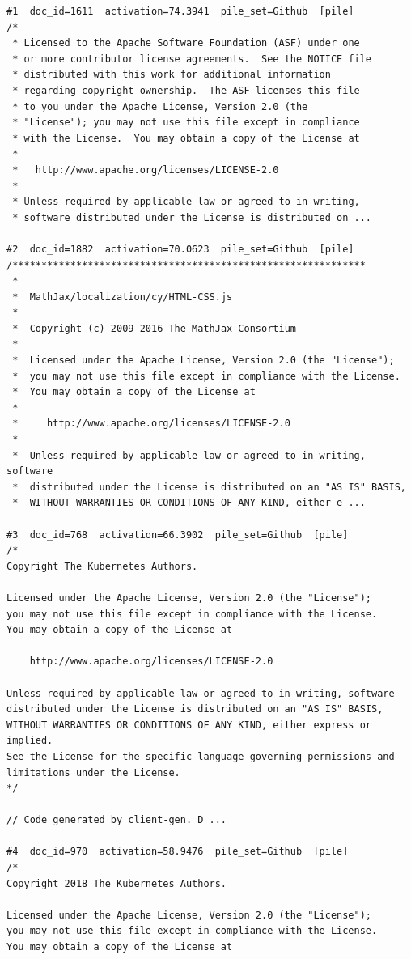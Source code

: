 \begin{verbatim}
#1  doc_id=1611  activation=74.3941  pile_set=Github  [pile]
/*
 * Licensed to the Apache Software Foundation (ASF) under one
 * or more contributor license agreements.  See the NOTICE file
 * distributed with this work for additional information
 * regarding copyright ownership.  The ASF licenses this file
 * to you under the Apache License, Version 2.0 (the
 * "License"); you may not use this file except in compliance
 * with the License.  You may obtain a copy of the License at
 *
 *   http://www.apache.org/licenses/LICENSE-2.0
 *
 * Unless required by applicable law or agreed to in writing,
 * software distributed under the License is distributed on ...

#2  doc_id=1882  activation=70.0623  pile_set=Github  [pile]
/*************************************************************
 *
 *  MathJax/localization/cy/HTML-CSS.js
 *
 *  Copyright (c) 2009-2016 The MathJax Consortium
 *
 *  Licensed under the Apache License, Version 2.0 (the "License");
 *  you may not use this file except in compliance with the License.
 *  You may obtain a copy of the License at
 *
 *     http://www.apache.org/licenses/LICENSE-2.0
 *
 *  Unless required by applicable law or agreed to in writing, software
 *  distributed under the License is distributed on an "AS IS" BASIS,
 *  WITHOUT WARRANTIES OR CONDITIONS OF ANY KIND, either e ...

#3  doc_id=768  activation=66.3902  pile_set=Github  [pile]
/*
Copyright The Kubernetes Authors.

Licensed under the Apache License, Version 2.0 (the "License");
you may not use this file except in compliance with the License.
You may obtain a copy of the License at

    http://www.apache.org/licenses/LICENSE-2.0

Unless required by applicable law or agreed to in writing, software
distributed under the License is distributed on an "AS IS" BASIS,
WITHOUT WARRANTIES OR CONDITIONS OF ANY KIND, either express or implied.
See the License for the specific language governing permissions and
limitations under the License.
*/

// Code generated by client-gen. D ...

#4  doc_id=970  activation=58.9476  pile_set=Github  [pile]
/*
Copyright 2018 The Kubernetes Authors.

Licensed under the Apache License, Version 2.0 (the "License");
you may not use this file except in compliance with the License.
You may obtain a copy of the License at


\end{verbatim}
